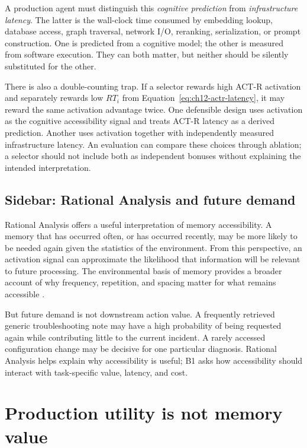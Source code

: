 A production agent must distinguish this \emph{cognitive prediction} from \emph{infrastructure latency}. The latter is the wall-clock time consumed by embedding lookup, database access, graph traversal, network I/O, reranking, serialization, or prompt construction. One is predicted from a cognitive model; the other is measured from software execution. They can both matter, but neither should be silently substituted for the other.

There is also a double-counting trap. If a selector rewards high ACT-R activation and separately rewards low \(RT_i\) from Equation~\ref{eq:ch12-actr-latency}, it may reward the same activation advantage twice. One defensible design uses activation as the cognitive accessibility signal and treats ACT-R latency as a derived prediction. Another uses activation together with independently measured infrastructure latency. An evaluation can compare these choices through ablation; a selector should not include both as independent bonuses without explaining the intended interpretation.

\subsection{Sidebar: Rational Analysis and future demand}
\label{subsec:ch12-rational-analysis}

Rational Analysis offers a useful interpretation of memory accessibility. A memory that has occurred often, or has occurred recently, may be more likely to be needed again given the statistics of the environment. From this perspective, an activation signal can approximate the likelihood that information will be relevant to future processing. The environmental basis of memory provides a broader account of why frequency, repetition, and spacing matter for what remains accessible \autocite{anderson2022environmental}.

But future demand is not downstream action value. A frequently retrieved generic troubleshooting note may have a high probability of being requested again while contributing little to the current incident. A rarely accessed configuration change may be decisive for one particular diagnosis. Rational Analysis helps explain why accessibility is useful; B1 asks how accessibility should interact with task-specific value, latency, and cost.

\section{Production utility is not memory value}
\label{sec:ch12-production-utility}

